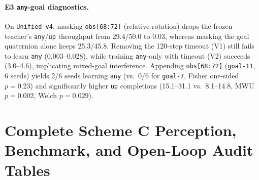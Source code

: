 \paragraph{E3 \texttt{any}-goal diagnostics.}
On \texttt{Unified v4}, masking \texttt{obs[68:72]} (relative rotation) drops the frozen teacher's \texttt{any}/\texttt{up} throughput from 29.4/50.0 to 0.03, whereas masking the goal quaternion alone keeps 25.3/45.8.
Removing the 120-step timeout (V1) still fails to learn \texttt{any} (0.003--0.028), while training \texttt{any}-only with timeout (V2) succeeds (3.0--4.6), implicating mixed-goal interference.
Appending \texttt{obs[68:72]} (\texttt{goal-11}, 6 seeds) yields 2/6 seeds learning \texttt{any} (vs.\ 0/6 for \texttt{goal-7}, Fisher one-sided $p=0.23$) and significantly higher \texttt{up} completions (15.1--31.1 vs.\ 8.1--14.8, MWU $p=0.002$, Welch $p=0.029$).

\section{Complete Scheme C Perception, Benchmark, and Open-Loop Audit Tables}
\label{app:scheme_c}

\begin{table}[h]
  \centering
  \caption{Held-out Z1 180-frame perception and overfitting-boundary audit (\texttt{test} split, 3-view \texttt{montage}, zero SoM tags, CircularEval). \texttt{C1-v1} generalizes visually; \texttt{C1-v2} repairs abstention (CBD) and unseen prompt \texttt{v3}.}
  \label{tab:vlm_perception}
  \small
  \setlength{\tabcolsep}{4.5pt}
\end{table}

